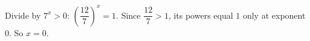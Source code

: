Divide by $7^x>0$: $\left(\dfrac{12}{7}\right)^x=1$. Since $\dfrac{12}{7}>1$, its powers equal $1$ only at exponent $0$. So $x=\boxed{0}$.
